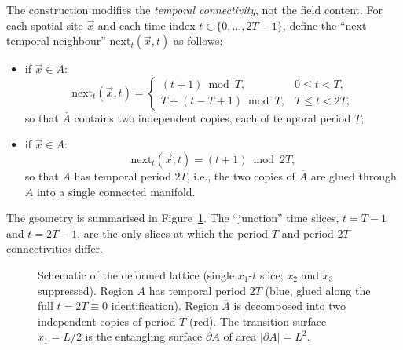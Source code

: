 \documentclass[11pt,a4paper]{article}
\theoremstyle{definition}
\newcommand{\bA}{\overline{A}}
\begin{document}
The construction modifies the \emph{temporal connectivity}, not the
field content. For each spatial site $\vec x$ and each time index
$t \in \{0,\dots,2T-1\}$, define the ``next temporal neighbour''
$\mathrm{next}_t(\vec x, t)$ as follows:
\begin{itemize}
   \item if $\vec x \in \bA$:
   \begin{equation}
     \mathrm{next}_t(\vec x, t) =
     \begin{cases}
       (t+1) \bmod T, & 0 \le t < T,\\
       T + (t - T + 1) \bmod T, & T \le t < 2T,
     \end{cases}
   \end{equation}
   so that $\bA$ contains two independent copies, each of temporal
   period $T$;
   \item if $\vec x \in A$:
   \begin{equation}
     \mathrm{next}_t(\vec x, t) = (t+1) \bmod 2T,
   \end{equation}
   so that $A$ has temporal period $2T$, i.e., the two copies of $\bA$
   are glued through $A$ into a single connected manifold.
\end{itemize}

The geometry is summarised in Figure~\ref{fig:geometry}. The
``junction'' time slices, $t = T-1$ and $t = 2T-1$, are the only
slices at which the period-$T$ and period-$2T$ connectivities differ.

\begin{figure}[t]
\centering
{}
\caption{Schematic of the deformed lattice (single $x_1$-$t$ slice;
$x_2$ and $x_3$ suppressed). Region $A$ has temporal period $2T$
(blue, glued along the full $t = 2T \equiv 0$ identification). Region
$\bA$ is decomposed into two independent copies of period $T$ (red).
The transition surface $x_1 = L/2$ is the entangling surface
$\partial A$ of area $|\partial A| = L^{2}$.}
\label{fig:geometry}
\end{figure}
\end{document}
